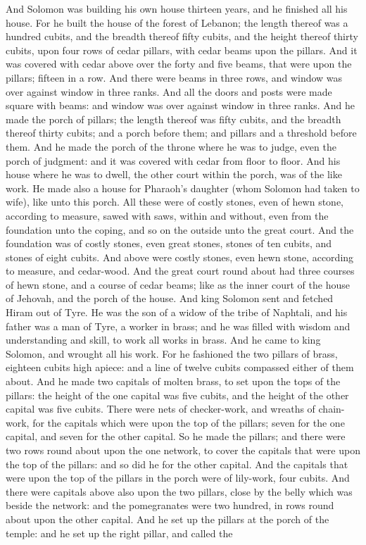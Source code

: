 And Solomon was building his own house thirteen years, and he finished all his house. For he built the house of the forest of Lebanon; the length thereof was a hundred cubits, and the breadth thereof fifty cubits, and the height thereof thirty cubits, upon four rows of cedar pillars, with cedar beams upon the pillars. And it was covered with cedar above over the forty and five beams, that were upon the pillars; fifteen in a row. And there were beams in three rows, and window was over against window in three ranks. And all the doors and posts were made square with beams: and window was over against window in three ranks. And he made the porch of pillars; the length thereof was fifty cubits, and the breadth thereof thirty cubits; and a porch before them; and pillars and a threshold before them. And he made the porch of the throne where he was to judge, even the porch of judgment: and it was covered with cedar from floor to floor. And his house where he was to dwell, the other court within the porch, was of the like work. He made also a house for Pharaoh’s daughter (whom Solomon had taken to wife), like unto this porch.  All these were of costly stones, even of hewn stone, according to measure, sawed with saws, within and without, even from the foundation unto the coping, and so on the outside unto the great court. And the foundation was of costly stones, even great stones, stones of ten cubits, and stones of eight cubits. And above were costly stones, even hewn stone, according to measure, and cedar-wood. And the great court round about had three courses of hewn stone, and a course of cedar beams; like as the inner court of the house of Jehovah, and the porch of the house.  And king Solomon sent and fetched Hiram out of Tyre. He was the son of a widow of the tribe of Naphtali, and his father was a man of Tyre, a worker in brass; and he was filled with wisdom and understanding and skill, to work all works in brass. And he came to king Solomon, and wrought all his work. For he fashioned the two pillars of brass, eighteen cubits high apiece: and a line of twelve cubits compassed either of them about. And he made two capitals of molten brass, to set upon the tops of the pillars: the height of the one capital was five cubits, and the height of the other capital was five cubits. There were nets of checker-work, and wreaths of chain-work, for the capitals which were upon the top of the pillars; seven for the one capital, and seven for the other capital. So he made the pillars; and there were two rows round about upon the one network, to cover the capitals that were upon the top of the pillars: and so did he for the other capital. And the capitals that were upon the top of the pillars in the porch were of lily-work, four cubits. And there were capitals above also upon the two pillars, close by the belly which was beside the network: and the pomegranates were two hundred, in rows round about upon the other capital. And he set up the pillars at the porch of the temple: and he set up the right pillar, and called the 